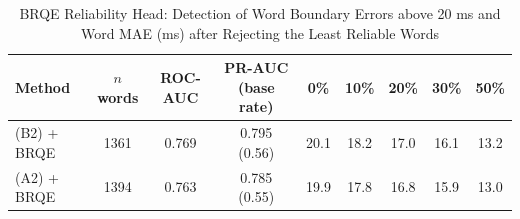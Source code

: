 \begin{table}[t]
\centering
\caption{BRQE Reliability Head: Detection of Word Boundary Errors above 20 ms and Word MAE (ms) after Rejecting the Least Reliable Words}
\label{tab:quality_estimation}
\begin{tabular}{lcccccccc}
\toprule
Method & \(n\) words & ROC-AUC & PR-AUC (base rate) & 0\% & 10\% & 20\% & 30\% & 50\% \\
\midrule
(B2) + BRQE & 1361 & 0.769 & 0.795 (0.56) & 20.1 & 18.2 & 17.0 & 16.1 & 13.2 \\
(A2) + BRQE & 1394 & 0.763 & 0.785 (0.55) & 19.9 & 17.8 & 16.8 & 15.9 & 13.0 \\
\bottomrule
\end{tabular}
\end{table}
